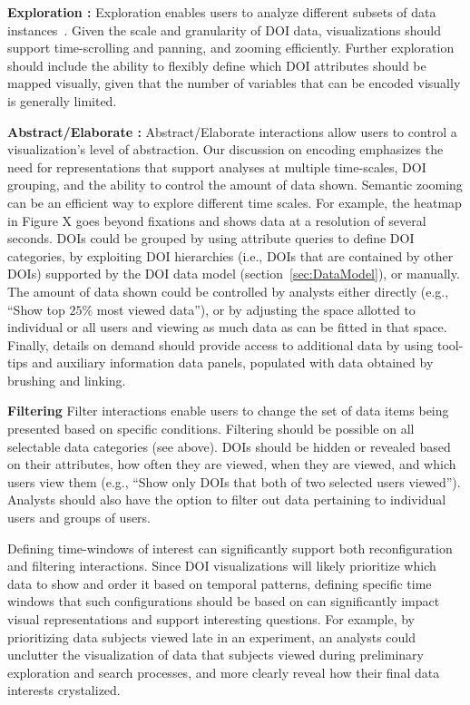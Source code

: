 \textbf{Exploration :} 
Exploration enables users to analyze different subsets of data instances~\cite{yi2007toward}. Given the scale and granularity of DOI data, visualizations should support time-scrolling and panning, and zooming efficiently. Further exploration should include the ability to flexibly define which DOI attributes should be mapped visually, given that the number of variables that can be encoded visually is generally limited. 
	
\textbf{Abstract/Elaborate :} 
Abstract/Elaborate interactions allow users to control a visualization's level of abstraction. Our discussion on encoding emphasizes the need for representations that support analyses at multiple time-scales, DOI grouping, and the ability to control the amount of data shown. Semantic zooming can be an efficient way to explore different time scales. For example, the heatmap in Figure X goes beyond fixations and shows data at a resolution of several seconds.  DOIs could be grouped by using attribute queries to define DOI categories, by exploiting DOI hierarchies (i.e., DOIs that are contained by other DOIs) supported by the DOI data model (section~\ref{sec:DataModel}), or manually. The amount of data shown could be controlled by analysts either directly (e.g., ``Show top $25\%$ most viewed data''), or by adjusting the space allotted to individual or all users and viewing as much data as can be fitted in that space. Finally, details on demand should provide access to additional data by using tool-tips and auxiliary information data panels, populated with data obtained by brushing and linking.
	
	
\textbf{Filtering}
Filter interactions enable users to change the set of data items being presented based on specific conditions. Filtering should be possible on all selectable data categories (see above). DOIs should be hidden or revealed based on their attributes, how often they are viewed, when they are viewed, and which users view them (e.g., ``Show only DOIs that both of two selected users viewed''). Analysts should also have the option to filter out data pertaining to individual users and groups of users. 

Defining time-windows of interest can significantly support both reconfiguration and filtering interactions. Since DOI visualizations will likely prioritize which data to show and order it based on temporal patterns, defining specific time windows that such configurations should be based on can significantly impact visual representations and support interesting questions. For example, by prioritizing data subjects viewed late in an experiment, an analysts could unclutter the visualization of data that subjects viewed during preliminary exploration and search processes, and more clearly reveal how their final data interests crystalized. 
	
